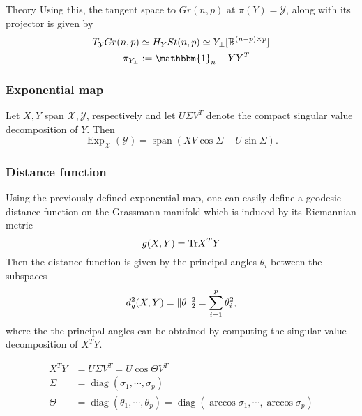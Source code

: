 \begin{chapter}{Theory}
Using this, the tangent space to $Gr(n,p)$ at $\pi(Y)=\mathcal{Y}$, along with its projector is given by 
\begin{align}
    \label{eq:grassmann_tangentspace}
    T_{\mathcal{Y}}Gr(n,p)&\simeq  H_YSt(n,p)\simeq Y_{\bot}[\mathbb{R}^{(n-p)\times p}]\\
    \pi_{Y_{\bot}}&:=\mathbbm{1}_n-YY^T
\end{align}



\subsubsection{Exponential map} %
\label{ssub:Exponential map}
Let $X, Y$ span $\mathcal{X}, \mathcal{Y}$, respectively and let $U\Sigma V^{T}$ denote the compact singular value decomposition of $Y$. Then
\begin{equation}
    \operatorname{Exp}_{\mathcal{X}}(\mathcal{Y})=\operatorname{span}\left( XV\cos\Sigma + U\sin\Sigma\right).
\end{equation}



\subsubsection{Distance function} %
\label{ssub:Distance function}
Using the previously defined exponential map, one can easily define a geodesic distance function on the Grassmann manifold which is induced by its Riemannian metric
\begin{equation}
    g(X,Y) = \textnormal{Tr} X^TY
\end{equation}
Then the distance function is given by the principal angles $\theta_i$ between the subspaces 
\begin{equation}
    \label{eq:gr_geod_dist}
    d_g^2(X,Y) = \| \theta \|_2^2=\sum_{i=1}^p\theta_i^2,
\end{equation}
where the the principal angles can be obtained by computing the singular value decomposition of $X^TY$.

\begin{align}
    X^TY &= U\Sigma V^T = U\cos\Theta V^T\\
    \Sigma &= \operatorname{diag} (\sigma_1,\cdots,\sigma_p)\\
    \Theta &= \operatorname{diag} (\theta_1,\cdots,\theta_p) = \operatorname{diag} (\arccos\sigma_1,\cdots,\arccos\sigma_p)
\end{align}


\end{chapter}

